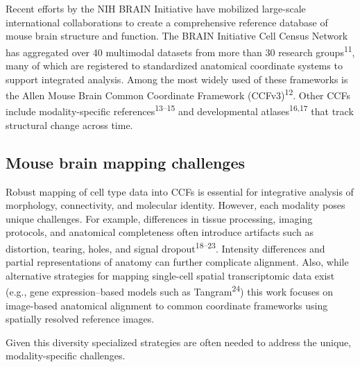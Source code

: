 \documentclass[
  12pt,
]{article}
\begin{document}
Recent efforts by the NIH BRAIN Initiative have mobilized large-scale
international collaborations to create a comprehensive reference
database of mouse brain structure and function. The BRAIN Initiative
Cell Census Network has aggregated over 40 multimodal datasets from more
than 30 research groups\textsuperscript{11}, many of which are
registered to standardized anatomical coordinate systems to support
integrated analysis. Among the most widely used of these frameworks is
the Allen Mouse Brain Common Coordinate Framework
(CCFv3)\textsuperscript{12}. Other CCFs include modality-specific
references\textsuperscript{13--15} and developmental
atlases\textsuperscript{16,17} that track structural change across time.

\subsection{Mouse brain mapping
challenges}\label{mouse-brain-mapping-challenges}

Robust mapping of cell type data into CCFs is essential for integrative
analysis of morphology, connectivity, and molecular identity. However,
each modality poses unique challenges. For example, differences in
tissue processing, imaging protocols, and anatomical completeness often
introduce artifacts such as distortion, tearing, holes, and signal
dropout\textsuperscript{18--23}. Intensity differences and partial
representations of anatomy can further complicate alignment. Also, while
alternative strategies for mapping single-cell spatial transcriptomic
data exist (e.g., gene expression--based models such as
Tangram\textsuperscript{24}) this work focuses on image-based anatomical
alignment to common coordinate frameworks using spatially resolved
reference images.

Given this diversity specialized strategies are often needed to address
the unique, modality-specific challenges.
\end{document}
